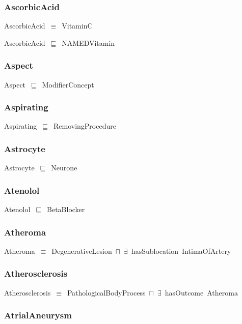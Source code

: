 \documentclass{article}
\begin{document}
\subsubsection*{AscorbicAcid}

AscorbicAcid~\ensuremath{\equiv}~VitaminC

AscorbicAcid~\ensuremath{\sqsubseteq}~NAMEDVitamin~

\subsubsection*{Aspect}

Aspect~\ensuremath{\sqsubseteq}~ModifierConcept~

\subsubsection*{Aspirating}

Aspirating~\ensuremath{\sqsubseteq}~RemovingProcedure~

\subsubsection*{Astrocyte}

Astrocyte~\ensuremath{\sqsubseteq}~Neurone~

\subsubsection*{Atenolol}

Atenolol~\ensuremath{\sqsubseteq}~BetaBlocker~

\subsubsection*{Atheroma}

Atheroma~\ensuremath{\equiv}~DegenerativeLesion~\ensuremath{\sqcap}~\ensuremath{\exists}~hasSublocation~IntimaOfArtery

\subsubsection*{Atherosclerosis}

Atherosclerosis~\ensuremath{\equiv}~PathologicalBodyProcess~\ensuremath{\sqcap}~\ensuremath{\exists}~hasOutcome~Atheroma

\subsubsection*{AtrialAneurysm}
\end{document}
